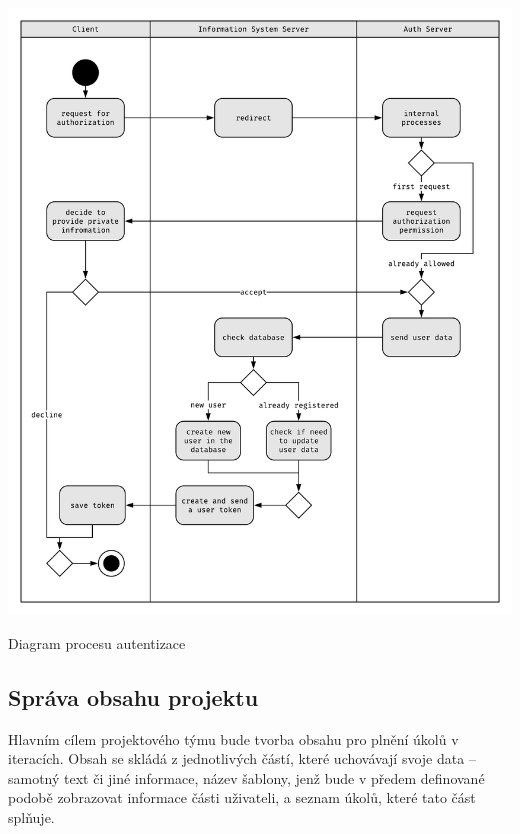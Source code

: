 \begin{fig:illustration}
   \includegraphics[width=1\textwidth]{images/dia-ak-auth.pdf}
   \caption[Diagram procesu autentizace]{Diagram procesu autentizace}\label{pic:dia-ak-auth}
\end{fig:illustration}




\subsection{Správa obsahu projektu}

Hlavním cílem projektového týmu bude tvorba obsahu pro plnění úkolů v iteracích. Obsah se skládá z jednotlivých částí, které uchovávají svoje data -- samotný text či jiné informace, název šablony, jenž bude v předem definované podobě zobrazovat informace části uživateli, a seznam úkolů, které tato část splňuje. 

